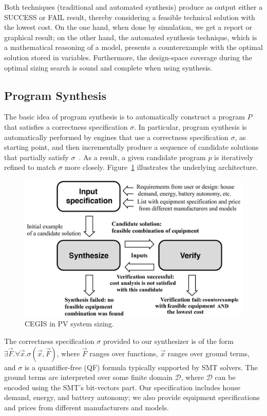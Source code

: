 \documentclass[runningheads]{llncs}
\begin{document}
Both techniques (traditional and automated synthesis)  produce as output either a SUCCESS or FAIL result, thereby considering a feasible technical solution with the lowest cost. On the one hand, when done by simulation, we get a report or graphical result; on the other hand, the automated synthesis technique, which is a mathematical reasoning of a model, presents a counterexample with the optimal solution stored in variables. Furthermore, the design-space coverage during the optimal sizing search is sound and complete when using synthesis.

\subsection{Program Synthesis}
\label{sec:ProgramSynthesis}

The basic idea of program synthesis is to automatically construct a program $P$ that satisfies a correctness specification $\sigma$. In particular, program synthesis is automatically performed by engines that use a correctness specification $\sigma$, as starting point, and then incrementally produce a sequence of candidate solutions that partially satisfy $\sigma$~\cite{Abateetal2017}. As a result, a given candidate program $p$ is iteratively refined to match $\sigma$ more closely. Figure~\ref{Counter-Example-Guided-Inductive-Synthesis} illustrates the underlying architecture. 
%
\begin{figure}
\begin{center}
	\includegraphics[width=0.5\columnwidth]{fig2_rev2.jpg}
\end{center}	
	\caption{CEGIS in PV system sizing.}
	\label{Counter-Example-Guided-Inductive-Synthesis}
\end{figure}

The correctness specification $\sigma$ provided to our synthesizer is of the form $\exists \vec{F}. \forall \vec{x}. \sigma(\vec{x}, \vec{F})$, where $\vec{F}$ ranges over functions, $\vec{x}$ ranges over ground terms, and $\sigma$ is a quantifier-free (QF) formula typically supported by SMT solvers. The ground terms are interpreted over some finite domain $\mathcal{D}$, where $\mathcal{D}$ can be encoded using the SMT's bit-vectors part. Our specification includes house demand, energy, and battery autonomy; we also provide equipment specifications and prices from different manufacturers and models.
\end{document}

